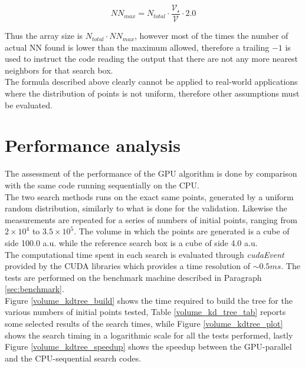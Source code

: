 \begin{center}
\begin{equation}
N\!N_{max} =  N_{total} \cdot \dfrac{\mathcal{V_s}}{\mathcal{V}} \cdot 2.0
\end{equation}
\end{center}

Thus the array size is $N_{total} \cdot N\!N_{max}$, however most of the times the number of actual NN found is lower than the maximum allowed, therefore a trailing $-1$ is used to instruct the code reading the output that there are not any more nearest neighbors for that search box.\\
The formula described above clearly cannot be applied to real-world applications where the distribution of points is not uniform, therefore other assumptions must be evaluated.\\

\section{Performance analysis}
The assessment of the performance of the GPU algorithm is done by comparison with the same code running sequentially on the CPU.\\
The two search methods runs on the exact same points, generated by a uniform random distribution, similarly to what is done for the validation. Likewise the measurements are repeated for a series of numbers of initial points, ranging from  $2 \times 10^{4}$ to $3.5 \times 10^{5}$. The volume in which the points are generated is a cube of side 100.0 a.u. while the reference search box is a cube of side 4.0 a.u.\\
The computational time spent in each search is evaluated through \textit{cudaEvent} provided by the CUDA libraries which provides a time resolution of $\sim 0.5\unit{ms}$. The tests are performed on the benchmark machine described in Paragraph \ref{sec:benchmark}.\\
Figure \ref{volume_kdtree_build} shows the time required to build the tree for the various numbers of initial points tested, Table \ref{volume_kd_tree_tab} reports some selected results of the search times, while Figure \ref{volume_kdtree_plot} shows the search timing in a logarithmic scale for all the tests performed, lastly Figure \ref{volume_kdtree_speedup} shows the speedup between the GPU-parallel and the CPU-sequential search codes.\\

